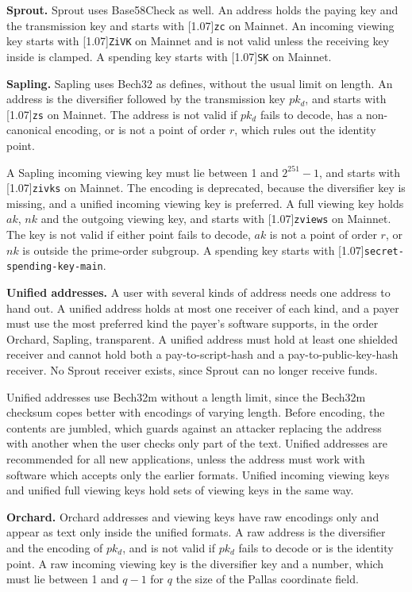 \documentclass{article}
\let\oldtexttt\texttt
\renewcommand{\texttt}[1]{\scalebox{0.97}[1.07]{\oldtexttt{#1}}}
\let\oldcite\cite
\renewcommand{\cite}[2][]{\raisebox{0ex}{\oldcite[{#1}]{#2}}}
\theoremstyle{labelledtheorem} %
\begin{document}
\textbf{Sprout.} Sprout uses Base58Check as well. An address holds the paying key and the transmission key and starts with \texttt{zc} on Mainnet. An incoming viewing key starts with \texttt{ZiVK} on Mainnet and is not valid unless the receiving key inside is clamped. A spending key starts with \texttt{SK} on Mainnet.

\textbf{Sapling.} Sapling uses Bech32 as \cite{ZIP-173} defines, without the usual limit on length. An address is the diversifier followed by the transmission key $\mathit{pk_d}$, and starts with \texttt{zs} on Mainnet. The address is not valid if $\mathit{pk_d}$ fails to decode, has a non-canonical encoding, or is not a point of order $r$, which rules out the identity point.

A Sapling incoming viewing key must lie between 1 and $2^{251} - 1$, and starts with \texttt{zivks} on Mainnet. The encoding is deprecated, because the diversifier key is missing, and a unified incoming viewing key is preferred. A full viewing key holds $\mathit{ak}$, $\mathit{nk}$ and the outgoing viewing key, and starts with \texttt{zviews} on Mainnet. The key is not valid if either point fails to decode, $\mathit{ak}$ is not a point of order $r$, or $\mathit{nk}$ is outside the prime-order subgroup. A spending key starts with \texttt{secret-spending-key-main}.

\textbf{Unified addresses.} A user with several kinds of address needs one address to hand out. A unified address \cite{ZIP-316} holds at most one receiver of each kind, and a payer must use the most preferred kind the payer's software supports, in the order Orchard, Sapling, transparent. A unified address must hold at least one shielded receiver and cannot hold both a pay-to-script-hash and a pay-to-public-key-hash receiver. No Sprout receiver exists, since Sprout can no longer receive funds.

Unified addresses use Bech32m \cite{BIP-350} without a length limit, since the Bech32m checksum copes better with encodings of varying length. Before encoding, the contents are jumbled, which guards against an attacker replacing the address with another when the user checks only part of the text. Unified addresses are recommended for all new applications, unless the address must work with software which accepts only the earlier formats. Unified incoming viewing keys and unified full viewing keys hold sets of viewing keys in the same way.

\textbf{Orchard.} Orchard addresses and viewing keys have raw encodings only and appear as text only inside the unified formats. A raw address is the diversifier and the encoding of $\mathit{pk_d}$, and is not valid if $\mathit{pk_d}$ fails to decode or is the identity point. A raw incoming viewing key is the diversifier key and a number, which must lie between 1 and $q - 1$ for $q$ the size of the Pallas coordinate field.
\end{document}
